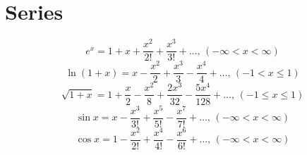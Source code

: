 \section{Series}
$$e^x = 1+x+\frac{x^2}{2!}+\frac{x^3}{3!}+\dots,\,(-\infty<x<\infty)$$
$$\ln(1+x) = x-\frac{x^2}{2}+\frac{x^3}{3}-\frac{x^4}{4}+\dots,\,(-1<x\leq1)$$
$$\sqrt{1+x} = 1+\frac{x}{2}-\frac{x^2}{8}+\frac{2x^3}{32}-\frac{5x^4}{128}+\dots,\,(-1\leq x\leq1)$$
$$\sin x = x-\frac{x^3}{3!}+\frac{x^5}{5!}-\frac{x^7}{7!}+\dots,\,(-\infty<x<\infty)$$
$$\cos x = 1-\frac{x^2}{2!}+\frac{x^4}{4!}-\frac{x^6}{6!}+\dots,\,(-\infty<x<\infty)$$






